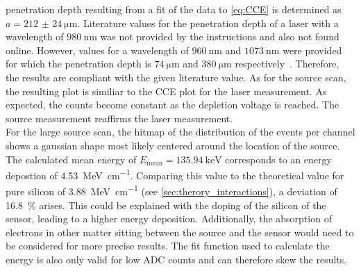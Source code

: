 penetration depth resulting from a fit of the data to \autoref{eq:CCE} is determined as $a = \qty{212(24)}{\micro\metre}$.
Literature values for the penetration depth of a laser with a wavelength of $\qty{980}{\nano\metre}$ was not provided
by the instructions and also not found online. However, values for a wavelength of $\qty{960}{\nano\metre}$ and $\qty{1073}{\nano\metre}$
were provided for which the penetration depth is $\qty{74}{\micro\metre}$ and $\qty{380}{\micro\metre}$ respectively~\cite{SiliconStrip}. Therefore,
the results are compliant with the given literature value. As for the source scan, the resulting plot is similiar 
to the CCE plot for the laser measurement. As expected, the counts become constant as the depletion voltage is reached.
The source measurement reaffirms the laser measurement.\\
For the large source scan, the hitmap of the distribution of the events per channel shows a gaussian shape most likely centered around the location of the source.
The calculated mean energy of $E_{\mathrm{mean}} = \qty{135.94}{\kilo\electronvolt}$ corresponds to an energy depostion of \qty{4.53}{\mega\electronvolt\per\centi\metre}.
Comparing this value to the theoretical value for pure silicon of \qty{3.88}{\mega\electronvolt\per\centi\metre} (see \ref{sec:therory_interactions}), a deviation of \qty{16.8}{\percent} arises.
This could be explained with the doping of the silicon of the sensor, leading to a higher energy deposition. Additionally, the absorption of electrons in other 
matter sitting between the source and the sensor would need to be considered for more precise results. The fit function used to calculate the energy is also only 
valid for low ADC counts and can therefore skew the results.
